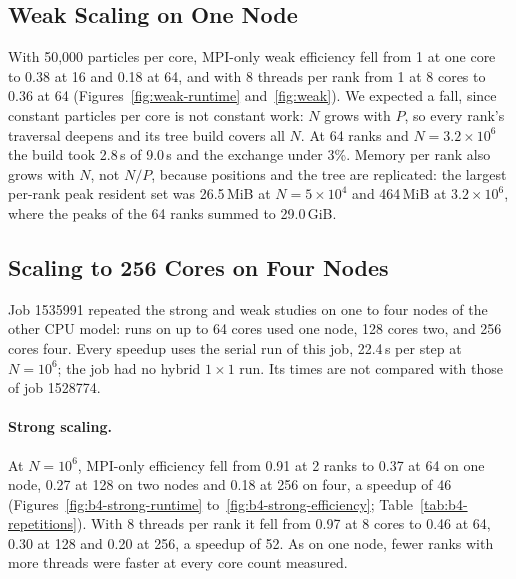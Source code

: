 \documentclass[10pt,a4paper,twocolumn,twoside]{rho-class/rho}
\begin{document}
\subsection{Weak Scaling on One Node}
\label{sec:weak}
With 50{,}000 particles per core, MPI-only weak efficiency fell from 1 at one core to 0.38 at 16 and 0.18 at 64, and with 8 threads per rank from 1 at 8 cores to 0.36 at 64 (Figures~\ref{fig:weak-runtime} and~\ref{fig:weak}). We expected a fall, since constant particles per core is not constant work: $N$ grows with $P$, so every rank's traversal deepens and its tree build covers all $N$. At 64 ranks and $N=3.2\times10^6$ the build took 2.8\,s of 9.0\,s and the exchange under 3\%. Memory per rank also grows with $N$, not $N/P$, because positions and the tree are replicated: the largest per-rank peak resident set was 26.5\,MiB at $N=5\times10^4$ and 464\,MiB at $3.2\times10^6$, where the peaks of the 64 ranks summed to 29.0\,GiB.

\subsection{Scaling to 256 Cores on Four Nodes}
\label{sec:b4}
Job 1535991 repeated the strong and weak studies on one to four nodes of the other CPU model: runs on up to 64 cores used one node, 128 cores two, and 256 cores four. Every speedup uses the serial run of this job, 22.4\,s per step at $N=10^6$; the job had no hybrid $1\times1$ run. Its times are not compared with those of job 1528774.

\paragraph{Strong scaling.} At $N=10^6$, MPI-only efficiency fell from 0.91 at 2 ranks to 0.37 at 64 on one node, 0.27 at 128 on two nodes and 0.18 at 256 on four, a speedup of 46 (Figures~\ref{fig:b4-strong-runtime} to~\ref{fig:b4-strong-efficiency}; Table~\ref{tab:b4-repetitions}). With 8 threads per rank it fell from 0.97 at 8 cores to 0.46 at 64, 0.30 at 128 and 0.20 at 256, a speedup of 52. As on one node, fewer ranks with more threads were faster at every core count measured.
\end{document}
